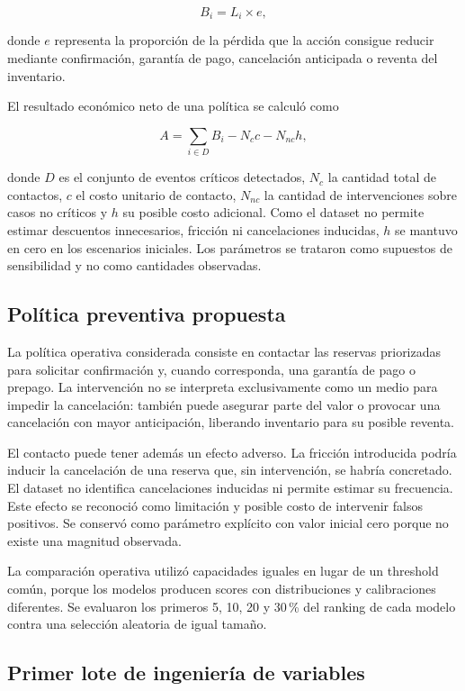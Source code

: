 \[
    B_i = L_i \times e,
\]

donde $e$ representa la proporción de la pérdida que la acción consigue
reducir mediante confirmación, garantía de pago, cancelación anticipada o
reventa del inventario.

El resultado económico neto de una política se calculó como

\[
    A = \sum_{i \in D} B_i - N_c c - N_{nc} h,
\]

donde $D$ es el conjunto de eventos críticos detectados, $N_c$ la cantidad
total de contactos, $c$ el costo unitario de contacto, $N_{nc}$ la cantidad de
intervenciones sobre casos no críticos y $h$ su posible costo adicional. Como
el dataset no permite estimar descuentos innecesarios, fricción ni
cancelaciones inducidas, $h$ se mantuvo en cero en los escenarios iniciales.
Los parámetros se trataron como supuestos de sensibilidad y no como cantidades
observadas.

\subsection{Política preventiva propuesta}

La política operativa considerada consiste en contactar las reservas
priorizadas para solicitar confirmación y, cuando corresponda, una garantía
de pago o prepago. La intervención no se interpreta exclusivamente como un
medio para impedir la cancelación: también puede asegurar parte del valor o
provocar una cancelación con mayor anticipación, liberando inventario para
su posible reventa.

El contacto puede tener además un efecto adverso. La fricción introducida
podría inducir la cancelación de una reserva que, sin intervención, se
habría concretado. El dataset no identifica cancelaciones inducidas ni
permite estimar su frecuencia. Este efecto se reconoció como limitación y
posible costo de intervenir falsos positivos. Se conservó como parámetro
explícito con valor inicial cero porque no existe una magnitud observada.

La comparación operativa utilizó capacidades iguales en lugar de un threshold
común, porque los modelos producen scores con distribuciones y calibraciones
diferentes. Se evaluaron los primeros 5, 10, 20 y 30\,\% del ranking de cada
modelo contra una selección aleatoria de igual tamaño.

\subsection{Primer lote de ingeniería de variables}

